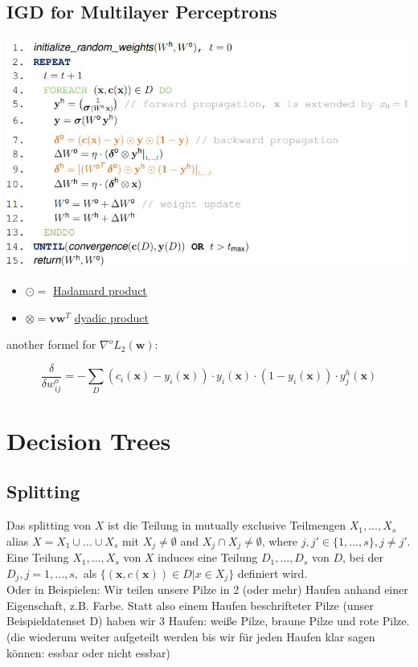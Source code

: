 \documentclass[11pt,a4paper]{article}
\begin{document}
\begin{flushleft}
\subsection{IGD for Multilayer Perceptrons}
\includegraphics[width= \textwidth]{MultiIGD}
\begin{itemize}
\item $\odot = $ \href{https://en.wikipedia.org/wiki/Hadamard_product_(matrices)}{Hadamard product}
\item $ \otimes  = \textbf{vw}^T $ \href{https://en.wikipedia.org/wiki/Dyadics}{dyadic product}
\end{itemize}
another formel for $ \nabla^o L_2 (\textbf{w})$: 

$$ \frac{\delta}{\delta w^o _ {ij}} = - \sum_D (c_i (\textbf{x}) - y_i(\textbf{x})) \cdot y_i(\textbf{x}) \cdot (1- y_i (\textbf{x})) \cdot y_j^h(\textbf{x}) $$ 

\section{Decision Trees}
\subsection{Splitting}

Das splitting von $X$ ist die Teilung in mutually exclusive Teilmengen $X_1, . . . , X_s$ alias $X = X_1 \cup ... \cup X_s$ mit $X_j \neq \emptyset$ and $X_j \cap X_j \neq \emptyset$, where $j, j' \in \{1, . . . , s\}, j \neq j'$.
Eine Teilung $X_1, ... , X_s$ von $X$ induces eine Teilung $D_1, . . . , D_s$ von $D$, bei der $D_j, j = 1, ... , s,$ als $\{(\textbf{x}, c(\textbf{x})) \in D | x \in X_j\}$ definiert wird. \\
Oder in Beispielen: Wir teilen unsere Pilze in 2 (oder mehr) Haufen anhand einer Eigenschaft, z.B. Farbe. Statt also einem Haufen beschrifteter Pilze (unser Beispieldatenset D) haben wir 3 Haufen: weiße Pilze, braune Pilze und rote Pilze. (die wiederum weiter aufgeteilt werden bis wir für jeden Haufen klar sagen können: essbar oder nicht essbar)\\


\end{flushleft}
\end{document}
